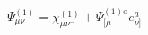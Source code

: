 \begin{equation}
\label{psib}
\Psi_{\mu\nu}^{(1)}=    \chi_{\mu\nu^-}^{(1)}
+\Psi^{(1)a}_{[\mu} e^a_{\nu]} 
\end{equation}

